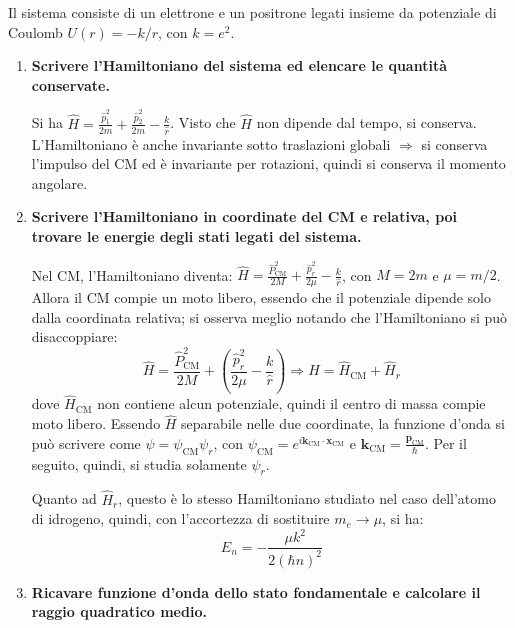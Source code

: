 \documentclass[11pt, a4paper]{scrartcl} %
\numberwithin{equation}{subsection}
\theoremstyle{style2}
\theoremstyle{style1}
\begin{document}
Il sistema consiste di un elettrone e un positrone legati insieme da potenziale di Coulomb $U(r) = - k / r$, con $k = e^2$.

\begin{enumerate}[(1).]
	\item \textbf{Scrivere l'Hamiltoniano del sistema ed elencare le quantit\`a conservate.} 

		Si ha $\displaystyle \hat{H} = \frac{\hat{p}_1 ^2 }{2m} + \frac{\hat{p}_2^2}{2m} - \frac{k}{\hat{r}}$. Visto che $\hat{H}$ non dipende dal tempo, si conserva. L'Hamiltoniano \`e anche invariante sotto traslazioni globali $\Rightarrow $ si conserva l'impulso del CM ed \`e invariante per rotazioni, quindi si conserva il momento angolare.
	\item \textbf{Scrivere l'Hamiltoniano in coordinate del CM e relativa, poi trovare le energie degli stati legati del sistema.}   

Nel CM, l'Hamiltoniano diventa: $\hat{H} = \displaystyle \frac{\hat{P}^2_\text{CM}}{2M} + \frac{\hat{p}_r^2}{2\mu } - \frac{k}{\hat{r}}$, con $M = 2m$ e $\mu = m / 2$. Allora il CM compie un moto libero, essendo che il potenziale dipende solo dalla coordinata relativa;
si osserva meglio notando che l'Hamiltoniano si pu\`o disaccoppiare: 
\[
\hat{H} = \frac{\hat{P}^2_\text{CM}}{2M} + \left(\frac{\hat{p}_r^2}{2\mu } - \frac{k}{\hat{r}}\right) \Rightarrow  \hat{H} = \hat{H}_\text{CM} + \hat{H}_r
\] 
dove $\hat{H}_\text{CM}$ non contiene alcun potenziale, quindi il centro di massa compie moto libero. 
Essendo $\hat{H}$ separabile nelle due coordinate, la funzione d'onda si pu\`o scrivere come $\psi = \psi _\text{CM} \psi _r$, con $\psi _\text{CM} = e ^{i \mathbf{k} _\text{CM}\cdot \mathbf{x} _\text{CM}} $ e $\mathbf{k} _\text{CM} = \frac{\mathbf{p} _\text{CM}}{\hbar }$. 
Per il seguito, quindi, si studia solamente $\psi _r$.

Quanto ad $\hat{H}_r$, questo \`e lo stesso Hamiltoniano studiato nel caso dell'atomo di idrogeno, quindi, con l'accortezza di sostituire $m_e \to \mu $, si ha:
\begin{equation}
	E_n = -\frac{\mu k^2}{2 (\hbar n)^2}
\end{equation}
\item \textbf{Ricavare funzione d'onda dello stato fondamentale e calcolare il raggio quadratico medio.} 


\end{enumerate}
\end{document}
